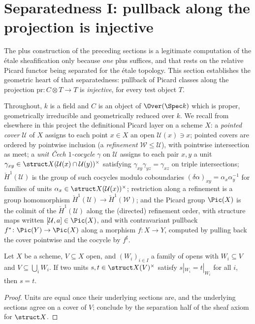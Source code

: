 \section{Separatedness I: pullback along the projection is injective}

The plus construction of the preceding sections is a legitimate computation of the \'etale
sheafification only because \emph{one} plus suffices, and that rests on the relative Picard
functor being separated for the \'etale topology. This section establishes the geometric heart
of that separatedness: pullback of Picard classes along the projection
\(\mathrm{pr} \colon C \otimes T \to T\) is \emph{injective}, for every test object \(T\).

Throughout, \(k\) is a field and \(C\) is an object of \(\Over(\Spec k)\) which is proper,
geometrically irreducible and geometrically reduced over \(k\). We recall from elsewhere in
this project the definitional Picard layer on a scheme \(X\): a \emph{pointed cover}
\(\mathcal U\) of \(X\) assigns to each point \(x \in X\) an open \(\mathcal U(x) \ni x\);
pointed covers are ordered by pointwise inclusion (a \emph{refinement}
\(\mathcal W \le \mathcal U\)), with pointwise intersection as meet; a \emph{unit \v Cech
\(1\)-cocycle} \(\gamma\) on \(\mathcal U\) assigns to each pair \(x,y\) a unit
\(\gamma_{xy} \in \struct X(\mathcal U(x) \cap \mathcal U(y))^{\times}\) satisfying
\(\gamma_{xy}\gamma_{yz} = \gamma_{xz}\) on triple intersections; \(\check H^1(\mathcal U)\)
is the group of such cocycles modulo coboundaries \((\delta\alpha)_{xy} =
\alpha_x\alpha_y^{-1}\) for families of units \(\alpha_x \in
\struct X(\mathcal U(x))^{\times}\); restriction along a refinement is a group homomorphism
\(\check H^1(\mathcal U) \to \check H^1(\mathcal W)\); and the Picard group
\(\Pic(X)\) is the colimit of the \(\check H^1(\mathcal U)\) along the (directed) refinement
order, with structure maps written \([\mathcal U, a] \in \Pic(X)\), and with contravariant
pullback \(f^{*} \colon \Pic(Y) \to \Pic(X)\) along a morphism \(f \colon X \to Y\), computed
by pulling back the cover pointwise and the cocycle by \(f^{\sharp}\).

\begin{lemma}
  \label{pa-lem:units_separation}
  \leanok

  Let \(X\) be a scheme, \(V \subseteq X\) open, and \((W_i)_{i \in I}\) a family of opens
  with \(W_i \subseteq V\) and \(V \subseteq \bigcup_i W_i\). If two units
  \(s, t \in \struct X(V)^{\times}\) satisfy \(s|_{W_i} = t|_{W_i}\) for all \(i\), then
  \(s = t\).
\end{lemma}
\begin{proof}
  \leanok
  Units are equal once their underlying sections are, and the underlying sections agree on a
  cover of \(V\); conclude by the separation half of the sheaf axiom for \(\struct X\).
\end{proof}

